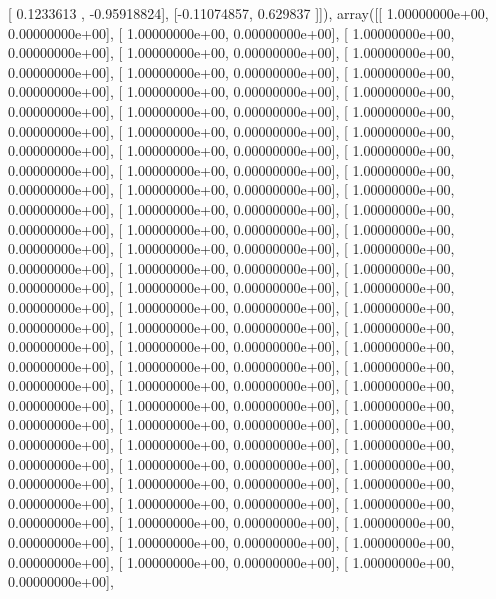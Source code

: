 \documentclass{article}
\begin{document}
       [ 0.1233613 , -0.95918824],
       [-0.11074857,  0.629837  ]]), array([[  1.00000000e+00,   0.00000000e+00],
       [  1.00000000e+00,   0.00000000e+00],
       [  1.00000000e+00,   0.00000000e+00],
       [  1.00000000e+00,   0.00000000e+00],
       [  1.00000000e+00,   0.00000000e+00],
       [  1.00000000e+00,   0.00000000e+00],
       [  1.00000000e+00,   0.00000000e+00],
       [  1.00000000e+00,   0.00000000e+00],
       [  1.00000000e+00,   0.00000000e+00],
       [  1.00000000e+00,   0.00000000e+00],
       [  1.00000000e+00,   0.00000000e+00],
       [  1.00000000e+00,   0.00000000e+00],
       [  1.00000000e+00,   0.00000000e+00],
       [  1.00000000e+00,   0.00000000e+00],
       [  1.00000000e+00,   0.00000000e+00],
       [  1.00000000e+00,   0.00000000e+00],
       [  1.00000000e+00,   0.00000000e+00],
       [  1.00000000e+00,   0.00000000e+00],
       [  1.00000000e+00,   0.00000000e+00],
       [  1.00000000e+00,   0.00000000e+00],
       [  1.00000000e+00,   0.00000000e+00],
       [  1.00000000e+00,   0.00000000e+00],
       [  1.00000000e+00,   0.00000000e+00],
       [  1.00000000e+00,   0.00000000e+00],
       [  1.00000000e+00,   0.00000000e+00],
       [  1.00000000e+00,   0.00000000e+00],
       [  1.00000000e+00,   0.00000000e+00],
       [  1.00000000e+00,   0.00000000e+00],
       [  1.00000000e+00,   0.00000000e+00],
       [  1.00000000e+00,   0.00000000e+00],
       [  1.00000000e+00,   0.00000000e+00],
       [  1.00000000e+00,   0.00000000e+00],
       [  1.00000000e+00,   0.00000000e+00],
       [  1.00000000e+00,   0.00000000e+00],
       [  1.00000000e+00,   0.00000000e+00],
       [  1.00000000e+00,   0.00000000e+00],
       [  1.00000000e+00,   0.00000000e+00],
       [  1.00000000e+00,   0.00000000e+00],
       [  1.00000000e+00,   0.00000000e+00],
       [  1.00000000e+00,   0.00000000e+00],
       [  1.00000000e+00,   0.00000000e+00],
       [  1.00000000e+00,   0.00000000e+00],
       [  1.00000000e+00,   0.00000000e+00],
       [  1.00000000e+00,   0.00000000e+00],
       [  1.00000000e+00,   0.00000000e+00],
       [  1.00000000e+00,   0.00000000e+00],
       [  1.00000000e+00,   0.00000000e+00],
       [  1.00000000e+00,   0.00000000e+00],
       [  1.00000000e+00,   0.00000000e+00],
       [  1.00000000e+00,   0.00000000e+00],
       [  1.00000000e+00,   0.00000000e+00],
       [  1.00000000e+00,   0.00000000e+00],
       [  1.00000000e+00,   0.00000000e+00],
       [  1.00000000e+00,   0.00000000e+00],
       [  1.00000000e+00,   0.00000000e+00],
       [  1.00000000e+00,   0.00000000e+00],
       [  1.00000000e+00,   0.00000000e+00],
\end{document}
